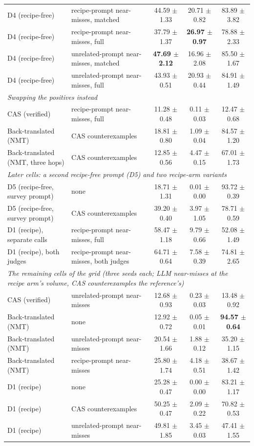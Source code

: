 \begin{table}[htbp]
{\begin{tabular}{llccc}
D4 (recipe-free) & recipe-prompt near-misses, matched & 44.59 $\pm$ 1.33 & 20.71 $\pm$ 0.82 & 83.89 $\pm$ 3.82 \\
D4 (recipe-free) & recipe-prompt near-misses, full & 37.79 $\pm$ 1.37 & \textbf{26.97 $\pm$ 0.97} & 78.88 $\pm$ 2.33 \\
D4 (recipe-free) & unrelated-prompt near-misses, matched & \textbf{47.69 $\pm$ 2.12} & 16.96 $\pm$ 2.08 & 85.50 $\pm$ 1.67 \\
D4 (recipe-free) & unrelated-prompt near-misses, full & 43.93 $\pm$ 0.51 & 20.93 $\pm$ 0.44 & 84.91 $\pm$ 1.49 \\
\multicolumn{5}{l}{\emph{Swapping the positives instead}} \\
CAS (verified) & recipe-prompt near-misses, full & 11.28 $\pm$ 0.48 & 0.11 $\pm$ 0.03 & 12.47 $\pm$ 0.68 \\
Back-translated (NMT) & CAS counterexamples & 18.81 $\pm$ 0.80 & 1.09 $\pm$ 0.04 & 84.57 $\pm$ 1.20 \\
Back-translated (NMT, three hops) & CAS counterexamples & 12.85 $\pm$ 0.56 & 4.47 $\pm$ 0.15 & 67.01 $\pm$ 1.73 \\
\multicolumn{5}{l}{\emph{Later cells: a second recipe-free prompt (D5) and two recipe-arm variants}} \\
D5 (recipe-free, survey prompt) & none & 18.71 $\pm$ 1.31 & 0.01 $\pm$ 0.00 & 93.72 $\pm$ 0.39 \\
D5 (recipe-free, survey prompt) & CAS counterexamples & 39.20 $\pm$ 0.40 & 3.97 $\pm$ 1.05 & 78.71 $\pm$ 0.59 \\
D1 (recipe), separate calls & recipe-prompt near-misses, full & 58.47 $\pm$ 1.18 & 9.79 $\pm$ 0.66 & 52.08 $\pm$ 1.49 \\
D1 (recipe), both judges & recipe-prompt near-misses, both judges & 64.71 $\pm$ 0.64 & 7.58 $\pm$ 0.39 & 74.81 $\pm$ 2.65 \\
\multicolumn{5}{l}{\emph{The remaining cells of the grid (three seeds each; LLM near-misses at the recipe arm's volume, CAS counterexamples the reference's)}} \\
CAS (verified) & unrelated-prompt near-misses & 12.68 $\pm$ 0.93 & 0.23 $\pm$ 0.03 & 13.48 $\pm$ 0.92 \\
Back-translated (NMT) & none & 12.92 $\pm$ 0.72 & 0.05 $\pm$ 0.01 & \textbf{94.57 $\pm$ 0.64} \\
Back-translated (NMT) & unrelated-prompt near-misses & 20.54 $\pm$ 1.66 & 1.88 $\pm$ 0.12 & 35.20 $\pm$ 1.15 \\
Back-translated (NMT) & recipe-prompt near-misses & 25.80 $\pm$ 1.74 & 4.18 $\pm$ 0.51 & 38.67 $\pm$ 1.42 \\
D1 (recipe) & none & 25.28 $\pm$ 0.47 & 0.00 $\pm$ 0.00 & 83.21 $\pm$ 1.17 \\
D1 (recipe) & CAS counterexamples & 50.25 $\pm$ 0.47 & 2.09 $\pm$ 0.22 & 70.82 $\pm$ 0.53 \\
D1 (recipe) & unrelated-prompt near-misses & 49.81 $\pm$ 1.85 & 3.45 $\pm$ 0.03 & 47.41 $\pm$ 1.55 \\
\bottomrule
\end{tabular}}
\end{table}

